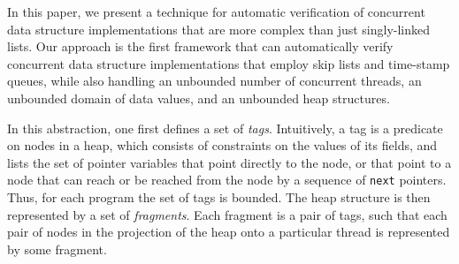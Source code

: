 In this paper, we present a technique for automatic verification of
concurrent data structure implementations that are more complex than
just singly-linked lists.
Our approach is the first framework that can automatically
verify concurrent data structure implementations that employ skip lists and
time-stamp queues, while also handling
an unbounded number of concurrent threads, an
unbounded domain of data values, and an unbounded heap structures.

In this abstraction, one first defines a
set of {\em tags}. Intuitively, a tag is a predicate on nodes in a heap,
which consists of constraints on the values of its fields, and lists
the set of pointer variables that point directly to the node, or that point
to a node that can reach or be reached from the node by a sequence of
{\tt next} pointers. Thus, for each program the set of tags is bounded.
The heap structure is then represented by a set of {\em fragments}. Each
fragment is a pair of tags, such that each pair of nodes in the
projection of the heap onto a particular thread is represented by some
fragment.




